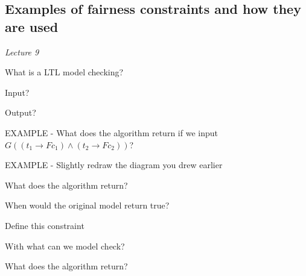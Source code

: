 \documentclass[fleqn]{article}
\begin{document}
\subsection{Examples of fairness constraints and how they are used}
\textit{Lecture 9}
\begin{enumerate}
    {\color{red}\item What is a LTL model checking?}
    \begin{itemize}
        {\color{red}\item Input?}
        {\color{red}\item Output?}
    \end{itemize}
    {\color{red}\item EXAMPLE - What does the algorithm return if we input $G ((t_1 \rightarrow Fc_1) \wedge (t_2 \rightarrow Fc_2))$?}
    {\color{red}\item EXAMPLE - Slightly redraw the diagram you drew earlier}
    \begin{itemize}
        {\color{red}\item What does the algorithm return?}
        {\color{red}\item When would the original model return true?}
        {\color{red}\item Define this constraint}
        {\color{red}\item With what can we model check?}
        {\color{red}\item What does the algorithm return?}
    \end{itemize}
\end{enumerate}
\end{document}
